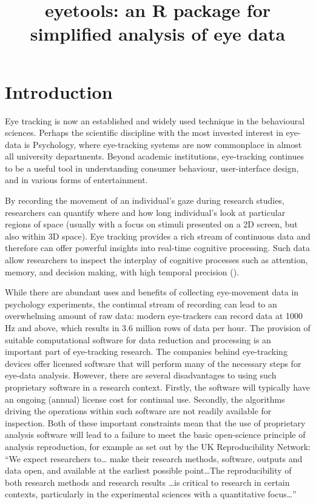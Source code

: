 \documentclass[
  man,
  floatsintext,
  longtable,
  nolmodern,
  notxfonts,
  notimes,
  colorlinks=true,linkcolor=blue,citecolor=blue,urlcolor=blue]{apa7}
\title{eyetools: an R package for simplified analysis of eye data}
\affiliation{
{Lancaster University}}
\begin{document}
\maketitle


\setcounter{secnumdepth}{-\maxdimen} %

\setlength\LTleft{0pt}

\resetlinenumber[1]

\section{Introduction}\label{introduction}

Eye tracking is now an established and widely used technique in the
behavioural sciences. Perhaps the scientific discipline with the most
invested interest in eye-data is Psychology, where eye-tracking systems
are now commonplace in almost all university departments. Beyond
academic institutions, eye-tracking continues to be a useful tool in
understanding consumer behaviour, user-interface design, and in various
forms of entertainment.

By recording the movement of an individual's gaze during research
studies, researchers can quantify where and how long individual's look
at particular regions of space (usually with a focus on stimuli
presented on a 2D screen, but also within 3D space). Eye tracking
provides a rich stream of continuous data and therefore can offer
powerful insights into real-time cognitive processing. Such data allow
researchers to inspect the interplay of cognitive processes such as
attention, memory, and decision making, with high temporal precision
().

While there are abundant uses and benefits of collecting eye-movement
data in psychology experiments, the continual stream of recording can
lead to an overwhelming amount of raw data: modern eye-trackers can
record data at 1000 Hz and above, which results in 3.6 million rows of
data per hour. The provision of suitable computational software for data
reduction and processing is an important part of eye-tracking research.
The companies behind eye-tracking devices offer licensed software that
will perform many of the necessary steps for eye-data analysis. However,
there are several disadvantages to using such proprietary software in a
research context. Firstly, the software will typically have an ongoing
(annual) license cost for continual use. Secondly, the algorithms
driving the operations within such software are not readily available
for inspection. Both of these important constraints mean that the use of
proprietary analysis software will lead to a failure to meet the basic
open-science principle of analysis reproduction, for example as set out
by the UK Reproducibility Network: ``We expect researchers to\ldots{}
make their research methods, software, outputs and data open, and
available at the earliest possible point\ldots The reproducibility of
both research methods and research results \ldots is critical to
research in certain contexts, particularly in the experimental sciences
with a quantitative focus\ldots{}''
\end{document}
